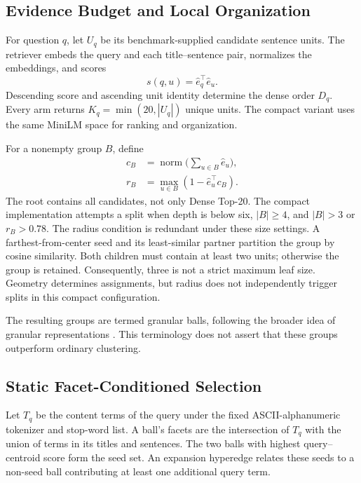 \documentclass[11pt]{article}
\begin{document}
\subsection{Evidence Budget and Local Organization}
For question $q$, let $U_q$ be its benchmark-supplied candidate sentence
units. The retriever embeds the query and each title--sentence pair, normalizes
the embeddings, and scores
\begin{equation}
s(q,u)=\hat e_q^\top\hat e_u.
\end{equation}
Descending score and ascending unit identity determine the dense order $D_q$.
Every arm returns $K_q=\min(20,|U_q|)$ unique units.
The compact variant uses the same MiniLM space for ranking and organization.

For a nonempty group $B$, define
\begin{equation}
\begin{aligned}
c_B&=\operatorname{norm}\Big(\sum_{u\in B}\hat e_u\Big),\\
r_B&=\max_{u\in B}(1-\hat e_u^\top c_B).
\end{aligned}
\end{equation}
The root contains all candidates, not only Dense Top-20. The compact
implementation attempts a split when depth is below six, $|B|\geq4$, and
$|B|>3$ or $r_B>0.78$. The radius condition is redundant under these size
settings. A farthest-from-center seed and its least-similar partner partition
the group by cosine similarity. Both children must contain at least two units;
otherwise the group is retained. Consequently, three is not a strict maximum
leaf size. Geometry determines assignments, but radius does not independently
trigger splits in this compact configuration.

The resulting groups are termed granular balls, following the broader idea of
granular representations \citep{xia2019granularball}. This terminology does not
assert that these groups outperform ordinary clustering.

\subsection{Static Facet-Conditioned Selection}
Let $T_q$ be the content terms of the query under the fixed ASCII-alphanumeric
tokenizer and stop-word list. A ball's facets are the intersection of $T_q$
with the union of terms in its titles and sentences. The two balls with highest
query--centroid score form the seed set. An expansion hyperedge relates these
seeds to a non-seed ball contributing at least one additional query term.
\end{document}

